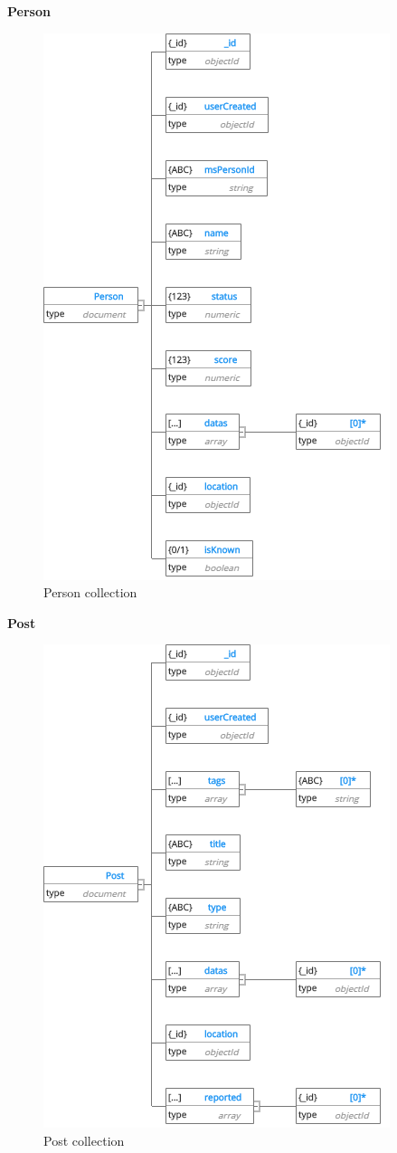 \cleardoublepage
\textbf{Person}
\begin{center}
    \begin{figure}[H]
    \centering
    \includegraphics[width=0.7\columnwidth]{images/chap4/Person.png}
    \caption{Person collection}
    \end{figure}
\end{center}
\cleardoublepage
\textbf{Post}
\begin{center}
    \begin{figure}[H]
    \centering
    \includegraphics[width=0.7\columnwidth]{images/chap4/Post.png}
    \caption{Post collection}
    \end{figure}
\end{center}

